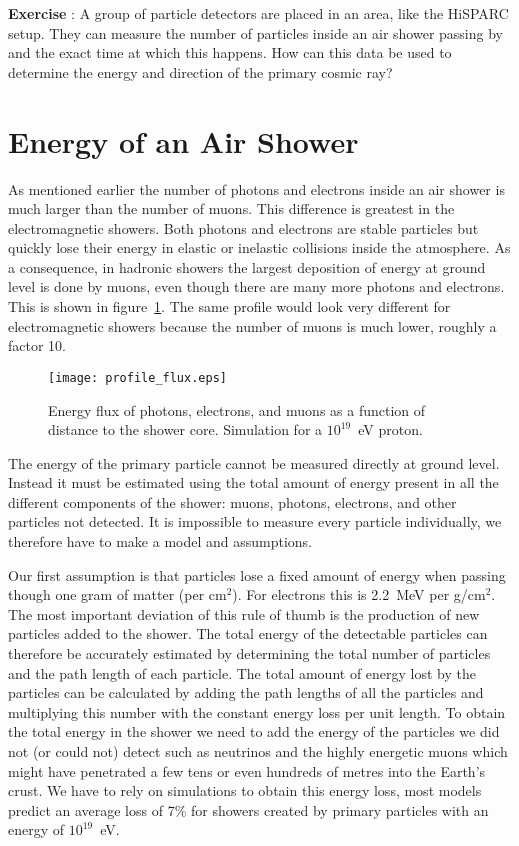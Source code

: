\begin{shaded}
\textbf{Exercise \theExercise {}} : A group of particle detectors are placed in an area, like the HiSPARC setup. They can measure the number of particles inside an air shower passing by and the exact time at which this happens. How can this data be used to determine the energy and direction of the primary cosmic ray?\end{shaded}

\section{Energy of an Air Shower}
As mentioned earlier the number of photons and electrons inside an air shower is much larger than the number of muons. This difference is greatest in the electromagnetic showers. Both photons and electrons are stable particles but quickly lose their energy in elastic or inelastic collisions inside the atmosphere. As a consequence, in hadronic showers the largest deposition of energy at ground level is done by muons, even though there are many more photons and electrons. This is shown in figure~\ref{fig:profile_flux}. The same profile would look very different for electromagnetic showers because the number of muons is much lower, roughly a factor 10.

\begin{figure}\begin{center}
\texttt{[image: profile\_flux.eps]}%
\caption{Energy flux of photons, electrons, and muons as a function of distance to the shower core. Simulation for a $10^{19}$~eV proton.}\label{fig:profile_flux}
\end{center}\end{figure}

The energy of the primary particle cannot be measured directly at ground level. Instead it must be estimated using the total amount of energy present in all the different components of the shower: muons, photons, electrons, and other particles not detected. It is impossible to measure every particle individually, we therefore have to make a model and assumptions.

Our first assumption is that particles lose a fixed amount of energy when passing though one gram of matter (per cm$^2$). For electrons this is 2.2~MeV per g/cm$^2$. The most important deviation of this rule of thumb is the production of new particles added to the shower. The total energy of the detectable particles can therefore be accurately estimated by determining the total number of particles and the path length of each particle. The total amount of energy lost by the particles can be calculated by adding the path lengths of all the particles and multiplying this number with the constant energy loss per unit length. To obtain the total energy in the shower we need to add the energy of the particles we did not (or could not) detect such as neutrinos and the highly energetic muons which might have penetrated a few tens or even hundreds of metres into the Earth's crust. We have to rely on simulations to obtain this energy loss, most models predict an average loss of 7\% for showers created by primary particles with an energy of $10^{19}$~eV.

